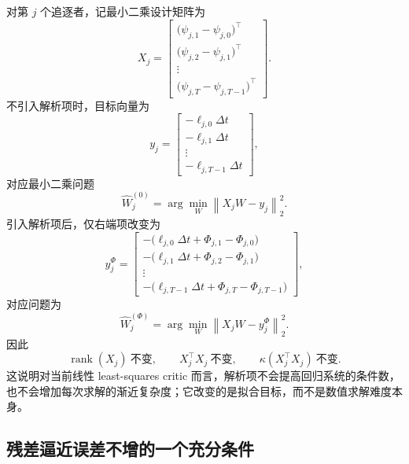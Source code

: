 \documentclass[11pt,a4paper]{article}
\DeclareMathOperator{\rank}{rank}
\newcommand{\norm}[1]{\left\lVert #1 \right\rVert}
\begin{document}
对第 $j$ 个追逐者，记最小二乘设计矩阵为
\begin{equation}
X_j=
\begin{bmatrix}
\big(\psi_{j,1}-\psi_{j,0}\big)^\top\\
\big(\psi_{j,2}-\psi_{j,1}\big)^\top\\
\vdots\\
\big(\psi_{j,T}-\psi_{j,T-1}\big)^\top
\end{bmatrix}.
\end{equation}
不引入解析项时，目标向量为
\begin{equation}
y_j=
\begin{bmatrix}
-\ell_{j,0}\Delta t\\
-\ell_{j,1}\Delta t\\
\vdots\\
-\ell_{j,T-1}\Delta t
\end{bmatrix},
\end{equation}
对应最小二乘问题
\begin{equation}
\hat W_j^{(0)}=\arg\min_W \norm{X_jW-y_j}_2^2.
\end{equation}
引入解析项后，仅右端项改变为
\begin{equation}
y_j^{\Phi}=
\begin{bmatrix}
-\big(\ell_{j,0}\Delta t+\Phi_{j,1}-\Phi_{j,0}\big)\\
-\big(\ell_{j,1}\Delta t+\Phi_{j,2}-\Phi_{j,1}\big)\\
\vdots\\
-\big(\ell_{j,T-1}\Delta t+\Phi_{j,T}-\Phi_{j,T-1}\big)
\end{bmatrix},
\end{equation}
对应问题为
\begin{equation}
\hat W_j^{(\Phi)}=\arg\min_W \norm{X_jW-y_j^{\Phi}}_2^2.
\label{eq:ls_phi}
\end{equation}
因此
\begin{equation}
\rank(X_j)\ \text{不变},\qquad
X_j^\top X_j\ \text{不变},\qquad
\kappa(X_j^\top X_j)\ \text{不变}.
\end{equation}
这说明对当前线性 least-squares critic 而言，解析项不会提高回归系统的条件数，也不会增加每次求解的渐近复杂度；它改变的是拟合目标，而不是数值求解难度本身。

\subsection{残差逼近误差不增的一个充分条件}
\end{document}
